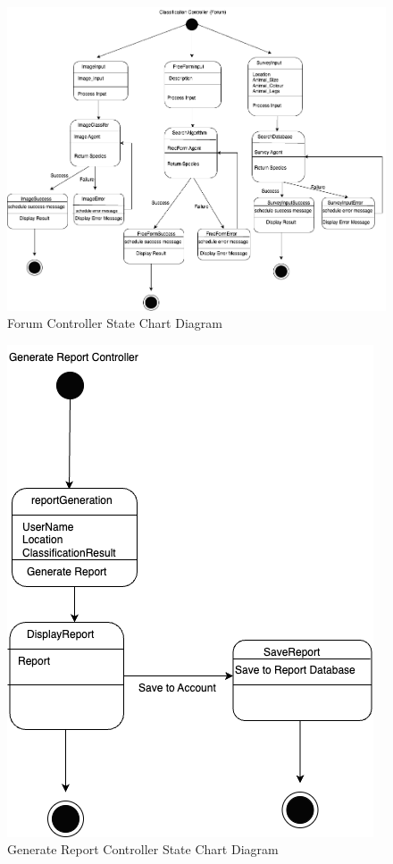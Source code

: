 \documentclass[]{article}
\numberwithin{figure}{section}
\begin{document}
\begin{figure}[h]
    \centering
    \includegraphics[scale=0.5]{Forum.png}
    \caption{Forum Controller State Chart Diagram}
    \label{fig:forum_controller}
\end{figure}
\clearpage 
\begin{figure}[h]
    \centering
    \includegraphics[scale=0.7]{GenerateReport.png}
    \caption{Generate Report Controller State Chart Diagram}
    \label{fig:generate_report_controller}
\end{figure}
\end{document}
